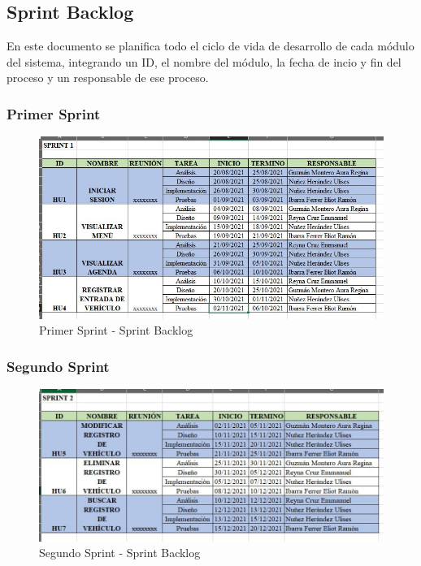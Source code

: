 \subsection{Sprint Backlog}
En este documento se planifica todo el ciclo de vida de desarrollo de cada módulo del sistema, integrando un ID, el nombre del módulo, la fecha de incio y fin del proceso y un responsable de ese proceso.
\subsubsection{Primer Sprint}
\begin{figure}[!h]
	\centering
	\includegraphics[width=1\textwidth]{./sprintBacklog/imagenes/sprint1}
	\caption{Primer Sprint - Sprint Backlog}
	\label{fig:Primer Sprint - Sprint Backlog}
\end{figure}
\clearpage
\subsubsection{Segundo Sprint}
\begin{figure}[!h]
	\centering
	\includegraphics[width=1\textwidth]{./sprintBacklog/imagenes/sprint2}
	\caption{Segundo Sprint - Sprint Backlog}
	\label{fig:egundo Sprint - Sprint Backlog}
\end{figure}